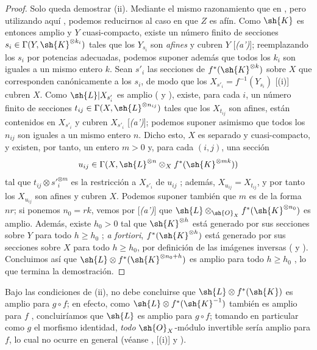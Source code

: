 \documentclass[oneside,10pt]{amsart}
\renewcommand{\geq}{\geqslant}
\newcommand{\oldpage}[2][]{\marginnote{\normalfont\footnotesize\textbf{#1}~|~#2}\ignorespaces}
\let\EGAOriginalLabel\label
\renewcommand{\label}[1]{\phantomsection\EGAOriginalLabel{#1}}
\begin{document}
\begin{proof}
Solo queda demostrar (ii).
Mediante el mismo razonamiento que en , pero utilizando aquí , podemos reducirnos al caso en que $Z$ es afín.
Como $\sh{K}$ es entonces amplio y $Y$ cuasi-compacto, existe un número finito de secciones $s_i\in\Gamma(Y,\sh{K}^{\otimes k_i})$ tales que los $Y_{s_i}$
\oldpage[II]{93}
son \emph{afines} y cubren $Y$ [\emph{(a')}];
reemplazando los $s_i$ por potencias adecuadas, podemos suponer además que todos los $k_i$ son iguales a un mismo entero $k$.
Sean $s'_i$ las secciones de $f^*(\sh{K}^{\otimes k})$ sobre $X$ que corresponden canónicamente a los $s_i$, de modo que los $X_{s'_i}=f^{-1}(Y_{s_i})$ [(i)] cubren $X$.
Como $\sh{L}|X_{s'_i}$ es amplio ( y ), existe, para cada $i$, un número finito de secciones $t_{ij}\in\Gamma(X,\sh{L}^{\otimes n_{ij}})$ tales que los $X_{t_{ij}}$ son afines, están contenidos en $X_{s'_i}$ y cubren $X_{s'_i}$ [\emph{(a')}];
podemos suponer asimismo que todos los $n_{ij}$ son iguales a un mismo entero $n$.
Dicho esto, $X$ es separado y cuasi-compacto, y existen, por tanto, un entero $m>0$ y, para cada $(i,j)$, una sección
\[
  u_{ij}\in\Gamma(X,\sh{L}^{\otimes n}\otimes_X f^*(\sh{K}^{\otimes mk}))
\]
tal que $t_{ij}\otimes s'^{\otimes m}_i$ es la restricción a $X_{s'_i}$ de $u_{ij}$ ;
además, $X_{u_{ij}}=X_{t_{ij}}$, y por tanto los $X_{u_{ij}}$ son afines y cubren $X$.
Podemos suponer también que $m$ es de la forma $nr$;
si ponemos $n_0=rk$, vemos por [\emph{(a')}] que $\sh{L}\otimes_{\sh{O}_X}f^*(\sh{K}^{\otimes n_0})$ es amplio.
Además, existe $h_0>0$ tal que $\sh{K}^{\otimes h}$ está generado por sus secciones sobre $Y$ para todo $h\geq h_0$ ;
\emph{a fortiori}, $f^*(\sh{K}^{\otimes h})$ está generado por sus secciones sobre $X$ para todo $h\geq h_0$, por definición de las imágenes inversas ( y ).
Concluimos así que $\sh{L}\otimes f^*(\sh{K}^{\otimes n_0+h})$ es amplio para todo $h\geq h_0$ , lo que termina la demostración.
\end{proof}

\begin{remark}[4.6.14]
\label{II.4.6.14}
Bajo las condiciones de (ii), no debe concluirse que $\sh{L}\otimes f^*(\sh{K})$ es amplio para $g\circ f$;
en efecto, como $\sh{L}\otimes f^*(\sh{K}^{-1})$ también es amplio para $f$ , concluiríamos que $\sh{L}$ es amplio para $g\circ f$;
tomando en particular como $g$ el morfismo identidad, \emph{todo} $\sh{O}_X$-módulo invertible sería amplio para $f$, lo cual no ocurre en general (véanse , [(i)] y ).
\end{remark}
\end{document}
